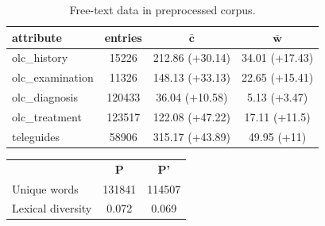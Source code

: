 \begin{table}[h]
\caption{Free-text data in preprocessed corpus.}
\label{table:corpus-preprocessed}
\begin{center}
\begin{tabular}{|l|c|c|c|}
\hline
\textbf{attribute}     & \textbf{entries} & $\mathbf{\bar{c}}$ & $\mathbf{\bar{w}}$   \\
\hline
olc\_history   & 15226  & 212.86 (+30.14) & 34.01 (+17.43) \\

olc\_examination & 11326  & 148.13 (+33.13) & 22.65 (+15.41) \\

olc\_diagnosis & 120433  & 36.04 (+10.58)  & 5.13 (+3.47)  \\

olc\_treatment    & 123517  & 122.08 (+47.22)  & 17.11 (+11.5) \\

teleguides & 58906 & 315.17 (+43.89)  & 49.95 (+11) \\
\hline
\end{tabular}
\end{center}
\label{table:free-text}
\end{table}



\begin{table}[ht]
\forceindent
\begin{tabular}{|l|cc|}
\hline
                  & \multicolumn{1}{c}{\textbf{P}} & \multicolumn{1}{c|}{\textbf{P'}} \\  
Unique words      & 131841                         & 114507                           \\
Lexical diversity & 0.072                          & 0.069                            \\ \hline
\end{tabular}

\end{table}

